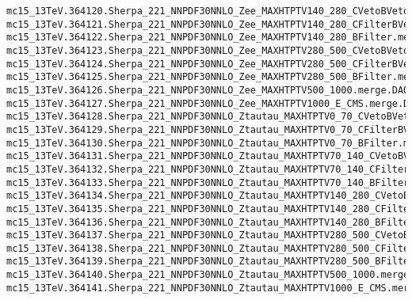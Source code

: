 \begin{scriptsize}
\begin{verbatim}
mc15_13TeV.364120.Sherpa_221_NNPDF30NNLO_Zee_MAXHTPTV140_280_CVetoBVeto.merge.DAOD_HIGG5D2.e5299_s2726_r7772_r7676_p2949
mc15_13TeV.364121.Sherpa_221_NNPDF30NNLO_Zee_MAXHTPTV140_280_CFilterBVeto.merge.DAOD_HIGG5D2.e5299_s2726_r7772_r7676_p2949
mc15_13TeV.364122.Sherpa_221_NNPDF30NNLO_Zee_MAXHTPTV140_280_BFilter.merge.DAOD_HIGG5D2.e5299_s2726_r7772_r7676_p2949
mc15_13TeV.364123.Sherpa_221_NNPDF30NNLO_Zee_MAXHTPTV280_500_CVetoBVeto.merge.DAOD_HIGG5D2.e5299_s2726_r7772_r7676_p2949
mc15_13TeV.364124.Sherpa_221_NNPDF30NNLO_Zee_MAXHTPTV280_500_CFilterBVeto.merge.DAOD_HIGG5D2.e5299_s2726_r7772_r7676_p2949
mc15_13TeV.364125.Sherpa_221_NNPDF30NNLO_Zee_MAXHTPTV280_500_BFilter.merge.DAOD_HIGG5D2.e5299_s2726_r7772_r7676_p2949
mc15_13TeV.364126.Sherpa_221_NNPDF30NNLO_Zee_MAXHTPTV500_1000.merge.DAOD_HIGG5D2.e5299_s2726_r7772_r7676_p2949
mc15_13TeV.364127.Sherpa_221_NNPDF30NNLO_Zee_MAXHTPTV1000_E_CMS.merge.DAOD_HIGG5D2.e5299_s2726_r7772_r7676_p2949
mc15_13TeV.364128.Sherpa_221_NNPDF30NNLO_Ztautau_MAXHTPTV0_70_CVetoBVeto.merge.DAOD_HIGG5D2.e5307_s2726_r7772_r7676_p2949
mc15_13TeV.364129.Sherpa_221_NNPDF30NNLO_Ztautau_MAXHTPTV0_70_CFilterBVeto.merge.DAOD_HIGG5D2.e5307_s2726_r7772_r7676_p2949
mc15_13TeV.364130.Sherpa_221_NNPDF30NNLO_Ztautau_MAXHTPTV0_70_BFilter.merge.DAOD_HIGG5D2.e5307_s2726_r7772_r7676_p2949
mc15_13TeV.364131.Sherpa_221_NNPDF30NNLO_Ztautau_MAXHTPTV70_140_CVetoBVeto.merge.DAOD_HIGG5D2.e5307_s2726_r7772_r7676_p2949
mc15_13TeV.364132.Sherpa_221_NNPDF30NNLO_Ztautau_MAXHTPTV70_140_CFilterBVeto.merge.DAOD_HIGG5D2.e5307_s2726_r7772_r7676_p2949
mc15_13TeV.364133.Sherpa_221_NNPDF30NNLO_Ztautau_MAXHTPTV70_140_BFilter.merge.DAOD_HIGG5D2.e5307_s2726_r7772_r7676_p2949
mc15_13TeV.364134.Sherpa_221_NNPDF30NNLO_Ztautau_MAXHTPTV140_280_CVetoBVeto.merge.DAOD_HIGG5D2.e5307_s2726_r7772_r7676_p2949
mc15_13TeV.364135.Sherpa_221_NNPDF30NNLO_Ztautau_MAXHTPTV140_280_CFilterBVeto.merge.DAOD_HIGG5D2.e5307_s2726_r7772_r7676_p2949
mc15_13TeV.364136.Sherpa_221_NNPDF30NNLO_Ztautau_MAXHTPTV140_280_BFilter.merge.DAOD_HIGG5D2.e5307_s2726_r7772_r7676_p2949
mc15_13TeV.364137.Sherpa_221_NNPDF30NNLO_Ztautau_MAXHTPTV280_500_CVetoBVeto.merge.DAOD_HIGG5D2.e5307_s2726_r7772_r7676_p2949
mc15_13TeV.364138.Sherpa_221_NNPDF30NNLO_Ztautau_MAXHTPTV280_500_CFilterBVeto.merge.DAOD_HIGG5D2.e5313_s2726_r7772_r7676_p2949
mc15_13TeV.364139.Sherpa_221_NNPDF30NNLO_Ztautau_MAXHTPTV280_500_BFilter.merge.DAOD_HIGG5D2.e5313_s2726_r7772_r7676_p2949
mc15_13TeV.364140.Sherpa_221_NNPDF30NNLO_Ztautau_MAXHTPTV500_1000.merge.DAOD_HIGG5D2.e5307_s2726_r7772_r7676_p2949
mc15_13TeV.364141.Sherpa_221_NNPDF30NNLO_Ztautau_MAXHTPTV1000_E_CMS.merge.DAOD_HIGG5D2.e5307_s2726_r7772_r7676_p2949
\end{verbatim}


\end{scriptsize}
